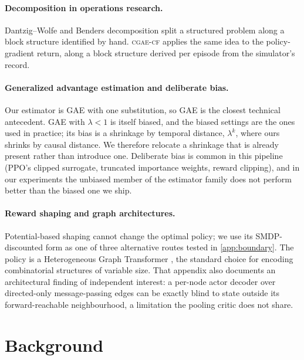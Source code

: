 \documentclass[review,authoryear,3p,times]{elsarticle}
\newcommand{\cflow}{\textsc{cgae-cf}}          %
\begin{document}
\paragraph{Decomposition in operations research.} Dantzig--Wolfe
\citep{dantzig1960decomposition} and Benders \citep{benders1962partitioning}
decomposition split a structured problem along a block structure identified by
hand. \cflow{} applies the same idea to the policy-gradient return, along a
block structure derived per episode from the simulator's record.

\paragraph{Generalized advantage estimation and deliberate bias.} Our estimator
is GAE \citep{gae2016} with one substitution, so GAE is the closest technical
antecedent. GAE with $\lambda<1$ is itself biased, and the biased settings are
the ones used in practice; its bias is a shrinkage by temporal distance,
$\lambda^k$, where ours shrinks by causal distance. We therefore relocate a
shrinkage that is already present rather than introduce one. Deliberate bias
is common in this pipeline (PPO's clipped surrogate, truncated importance
weights, reward clipping), and in our experiments the unbiased member of the
estimator family does not perform better than the biased one we ship.

\paragraph{Reward shaping and graph architectures.} Potential-based shaping
\citep{ng1999shaping} cannot change the optimal policy; we use its
SMDP-discounted form as one of three alternative routes tested in
\ref{app:boundary}. The policy is a Heterogeneous Graph Transformer
\citep{hu2020hgt}, the standard choice for encoding combinatorial structures of
variable size. That appendix also documents an architectural finding of
independent interest: a per-node actor decoder over directed-only
message-passing edges can be exactly blind to state outside its
forward-reachable neighbourhood, a limitation the pooling critic does not share.

\section{Background}
\label{sec:background}
\end{document}
